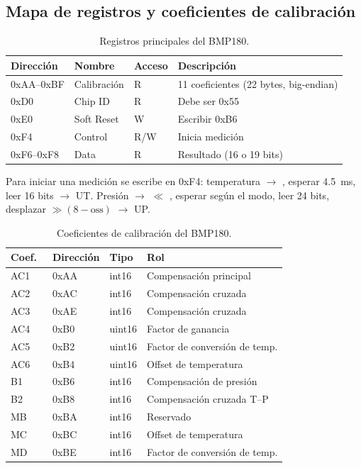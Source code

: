 \documentclass[11pt]{article}
\begin{document}
\subsection{Mapa de registros y coeficientes de calibración}
\begin{table}[H]\centering
\caption{Registros principales del BMP180.}
\begin{tabular}{llll}
\toprule
Dirección & Nombre & Acceso & Descripción \\
\midrule
0xAA--0xBF & Calibración & R & 11 coeficientes (22 bytes, big-endian) \\
0xD0       & Chip ID     & R & Debe ser 0x55 \\
0xE0       & Soft Reset  & W & Escribir 0xB6 \\
0xF4       & Control     & R/W & Inicia medición \\
0xF6--0xF8 & Data        & R & Resultado (16 o 19 bits) \\
\bottomrule
\end{tabular}
\end{table}
Para iniciar una medición se escribe en 0xF4: temperatura $\to$ , esperar
\SI{4.5}{\milli\second}, leer 16 bits $\to$ UT. Presión $\to$
 $\ll$ , esperar según el modo, leer 24 bits, desplazar
$\gg(8-\text{oss})$ $\to$ UP.

\begin{table}[H]\centering
\caption{Coeficientes de calibración del BMP180.}
\begin{tabular}{llll}
\toprule
Coef.\ & Dirección & Tipo & Rol \\
\midrule
AC1 & 0xAA & int16  & Compensación principal \\
AC2 & 0xAC & int16  & Compensación cruzada \\
AC3 & 0xAE & int16  & Compensación cruzada \\
AC4 & 0xB0 & uint16 & Factor de ganancia \\
AC5 & 0xB2 & uint16 & Factor de conversión de temp. \\
AC6 & 0xB4 & uint16 & Offset de temperatura \\
B1  & 0xB6 & int16  & Compensación de presión \\
B2  & 0xB8 & int16  & Compensación cruzada T--P \\
MB  & 0xBA & int16  & Reservado \\
MC  & 0xBC & int16  & Offset de temperatura \\
MD  & 0xBE & int16  & Factor de conversión de temp. \\
\bottomrule
\end{tabular}
\end{table}
\end{document}
